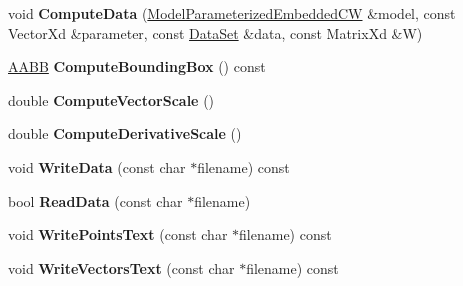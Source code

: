 \begin{DoxyCompactItemize}
\item 
\hypertarget{struct_d_r_d_s_p_1_1_reduced_data_a13cf0745aa959c739253cd0d19b77d02}{void {\bfseries Compute\-Data} (\hyperlink{struct_d_r_d_s_p_1_1_model_parameterized_embedded_c_w}{Model\-Parameterized\-Embedded\-C\-W} \&model, const Vector\-Xd \&parameter, const \hyperlink{struct_d_r_d_s_p_1_1_data_set}{Data\-Set} \&data, const Matrix\-Xd \&W)}\label{struct_d_r_d_s_p_1_1_reduced_data_a13cf0745aa959c739253cd0d19b77d02}

\item 
\hypertarget{struct_d_r_d_s_p_1_1_reduced_data_ae8d15e5d1a61ed5e495112e4941b9ecb}{\hyperlink{struct_d_r_d_s_p_1_1_a_a_b_b}{A\-A\-B\-B} {\bfseries Compute\-Bounding\-Box} () const }\label{struct_d_r_d_s_p_1_1_reduced_data_ae8d15e5d1a61ed5e495112e4941b9ecb}

\item 
\hypertarget{struct_d_r_d_s_p_1_1_reduced_data_a603dadcceb2b793a76851ec687adad12}{double {\bfseries Compute\-Vector\-Scale} ()}\label{struct_d_r_d_s_p_1_1_reduced_data_a603dadcceb2b793a76851ec687adad12}

\item 
\hypertarget{struct_d_r_d_s_p_1_1_reduced_data_a6b5e802882a81572f3db17e5d1b0afa2}{double {\bfseries Compute\-Derivative\-Scale} ()}\label{struct_d_r_d_s_p_1_1_reduced_data_a6b5e802882a81572f3db17e5d1b0afa2}

\item 
\hypertarget{struct_d_r_d_s_p_1_1_reduced_data_a2eaa9d6f19f0c80998fb06c3f2ef4035}{void {\bfseries Write\-Data} (const char $\ast$filename) const }\label{struct_d_r_d_s_p_1_1_reduced_data_a2eaa9d6f19f0c80998fb06c3f2ef4035}

\item 
\hypertarget{struct_d_r_d_s_p_1_1_reduced_data_a0eedb12f1ca3d0775d10472f491fc72b}{bool {\bfseries Read\-Data} (const char $\ast$filename)}\label{struct_d_r_d_s_p_1_1_reduced_data_a0eedb12f1ca3d0775d10472f491fc72b}

\item 
\hypertarget{struct_d_r_d_s_p_1_1_reduced_data_acdd330ae30b7a5f3621233bca26150a7}{void {\bfseries Write\-Points\-Text} (const char $\ast$filename) const }\label{struct_d_r_d_s_p_1_1_reduced_data_acdd330ae30b7a5f3621233bca26150a7}

\item 
\hypertarget{struct_d_r_d_s_p_1_1_reduced_data_a150dd17d6d407690c4b2924d6d7435f4}{void {\bfseries Write\-Vectors\-Text} (const char $\ast$filename) const }\label{struct_d_r_d_s_p_1_1_reduced_data_a150dd17d6d407690c4b2924d6d7435f4}

\end{DoxyCompactItemize}
